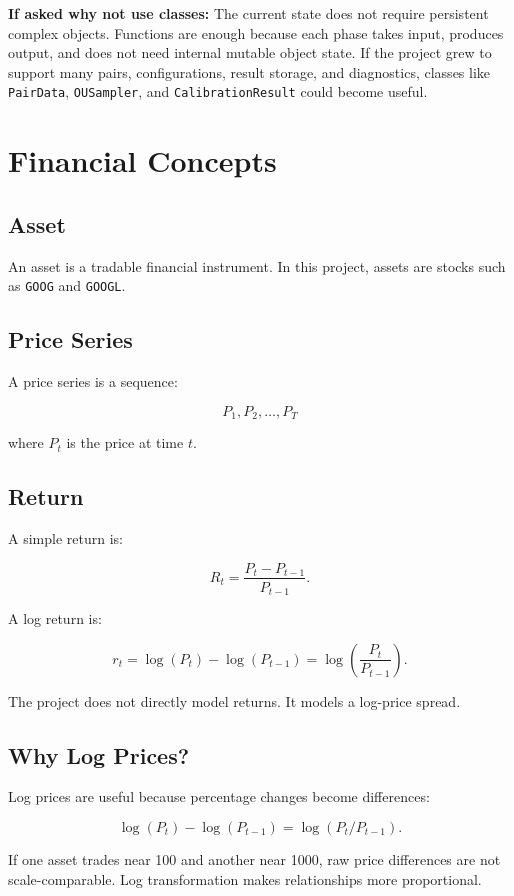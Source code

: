 \documentclass[11pt]{article}
\newcommand{\code}[1]{\texttt{#1}}
\begin{document}
\textbf{If asked why not use classes:} The current state does not require
persistent complex objects. Functions are enough because each phase takes input,
produces output, and does not need internal mutable object state. If the project
grew to support many pairs, configurations, result storage, and diagnostics,
classes like \code{PairData}, \code{OUSampler}, and \code{CalibrationResult}
could become useful.

\section{Financial Concepts}

\subsection{Asset}

An asset is a tradable financial instrument. In this project, assets are stocks
such as \code{GOOG} and \code{GOOGL}.

\subsection{Price Series}

A price series is a sequence:

\[
P_1, P_2, \dots, P_T
\]

where $P_t$ is the price at time $t$.

\subsection{Return}

A simple return is:

\[
R_t = \frac{P_t - P_{t-1}}{P_{t-1}}.
\]

A log return is:

\[
r_t = \log(P_t) - \log(P_{t-1}) = \log\left(\frac{P_t}{P_{t-1}}\right).
\]

The project does not directly model returns. It models a log-price spread.

\subsection{Why Log Prices?}

Log prices are useful because percentage changes become differences:

\[
\log(P_t) - \log(P_{t-1}) = \log(P_t/P_{t-1}).
\]

If one asset trades near 100 and another near 1000, raw price differences are
not scale-comparable. Log transformation makes relationships more proportional.
\end{document}
